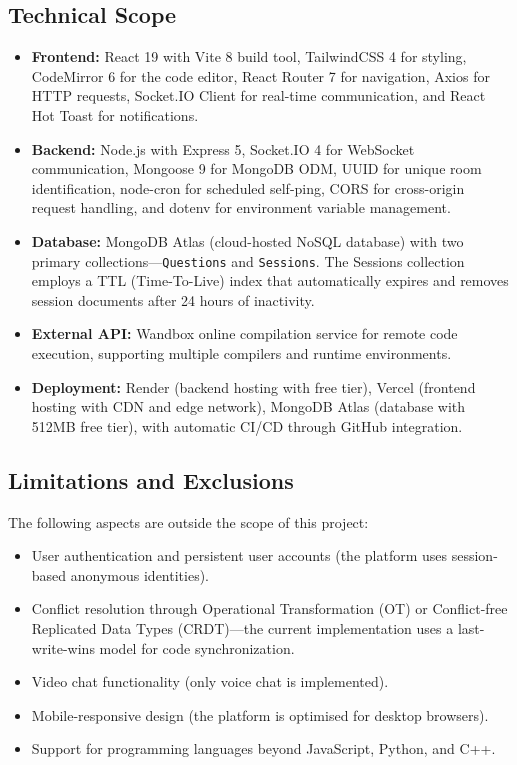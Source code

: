 \subsection{Technical Scope}

\begin{itemize}
    \item \textbf{Frontend:} React 19 with Vite 8 build tool, TailwindCSS 4 for styling, CodeMirror 6 for the code editor, React Router 7 for navigation, Axios for HTTP requests, Socket.IO Client for real-time communication, and React Hot Toast for notifications.
    \item \textbf{Backend:} Node.js with Express 5, Socket.IO 4 for WebSocket communication, Mongoose 9 for MongoDB ODM, UUID for unique room identification, node-cron for scheduled self-ping, CORS for cross-origin request handling, and dotenv for environment variable management.
    \item \textbf{Database:} MongoDB Atlas (cloud-hosted NoSQL database) with two primary collections---\texttt{Questions} and \texttt{Sessions}. The Sessions collection employs a TTL (Time-To-Live) index that automatically expires and removes session documents after 24 hours of inactivity.
    \item \textbf{External API:} Wandbox online compilation service for remote code execution, supporting multiple compilers and runtime environments.
    \item \textbf{Deployment:} Render (backend hosting with free tier), Vercel (frontend hosting with CDN and edge network), MongoDB Atlas (database with 512MB free tier), with automatic CI/CD through GitHub integration.
\end{itemize}

\subsection{Limitations and Exclusions}

The following aspects are outside the scope of this project:

\begin{itemize}
    \item User authentication and persistent user accounts (the platform uses session-based anonymous identities).
    \item Conflict resolution through Operational Transformation (OT) or Conflict-free Replicated Data Types (CRDT)---the current implementation uses a last-write-wins model for code synchronization.
    \item Video chat functionality (only voice chat is implemented).
    \item Mobile-responsive design (the platform is optimised for desktop browsers).
    \item Support for programming languages beyond JavaScript, Python, and C++.
\end{itemize}

